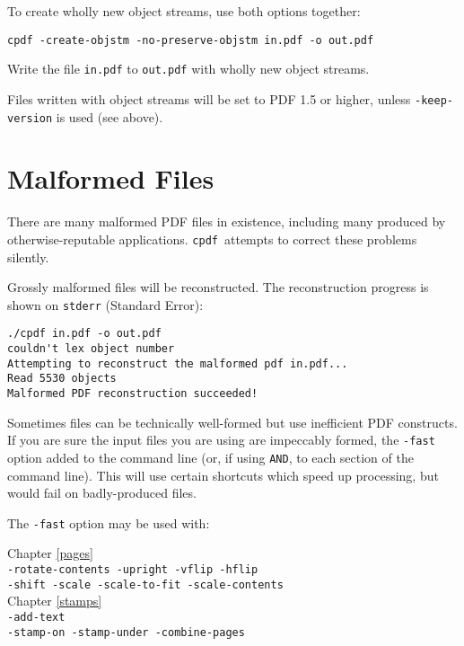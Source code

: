 \documentclass{book}
\newcommand{\cpdf}{\texttt{cpdf}}
\begin{document}
\noindent To create wholly new object streams, use both options together:

\begin{framed}
\small\verb!cpdf -create-objstm -no-preserve-objstm in.pdf -o out.pdf!

\vspace{2.5mm}
\noindent Write the file \texttt{in.pdf} to \texttt{out.pdf} with wholly new object streams.
\end{framed}

\noindent Files written with object streams will be set to PDF 1.5 or higher, unless \texttt{-keep-version} is used (see above).

\section{Malformed Files}

There are many malformed PDF files in existence, including many produced by
otherwise-reputable applications. \cpdf\ attempts to correct these problems
silently.

Grossly malformed files will be reconstructed. The reconstruction
progress is shown on \verb!stderr! (Standard Error):

\begin{framed}
\noindent\small\verb!./cpdf in.pdf -o out.pdf!\\
\small\verb!couldn't lex object number!\\
\small\verb!Attempting to reconstruct the malformed pdf in.pdf...!\\
\small\verb!Read 5530 objects!\\
\small\verb$Malformed PDF reconstruction succeeded!$
\end{framed}

\noindent Sometimes files can be technically well-formed but use inefficient PDF
constructs.  If you are sure the input files you are using are
impeccably formed, the \texttt{-fast} option added to the command line (or, if
using \texttt{AND}, to each section of the command line). This will use certain
shortcuts which speed up processing, but would fail on badly-produced files.

The \verb!-fast! option may be used with:

\begin{framed}
\small\noindent Chapter \ref{pages}\\
\noindent\small\verb!-rotate-contents -upright -vflip -hflip!\\
\small\verb!-shift -scale -scale-to-fit -scale-contents!\\

\noindent Chapter \ref{stamps}\\
\noindent\small\verb!-add-text!\\
\small\verb!-stamp-on -stamp-under -combine-pages!
\end{framed}
\end{document}
